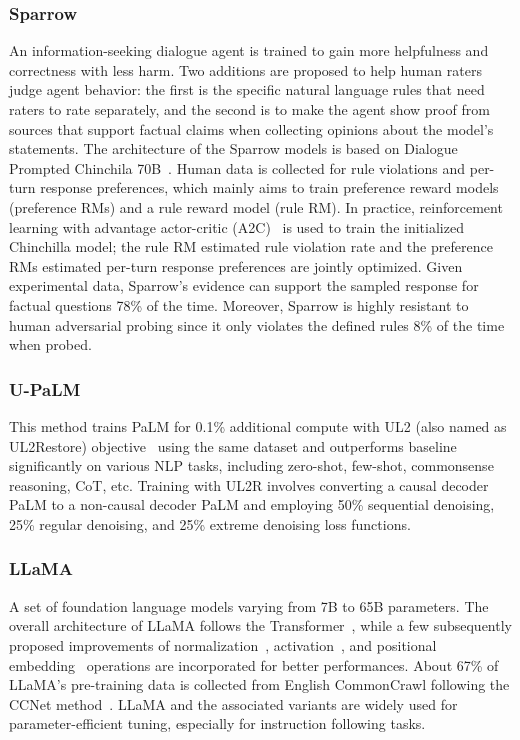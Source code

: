 \subsubsection{Sparrow~\cite{glaese2022improving}}
An information-seeking dialogue agent is trained to gain more helpfulness and correctness with less harm. Two additions are proposed to help human raters judge agent behavior: the first is the specific natural language rules that need raters to rate separately, and the second is to make the agent show proof from sources that support factual claims when collecting opinions about the model's statements. The architecture of the Sparrow models is based on Dialogue Prompted Chinchila 70B~\cite{chinchilla}. Human data is collected for rule violations and per-turn response preferences, which mainly aims to train preference reward models (preference RMs) and a rule reward model (rule RM). In practice, reinforcement learning with advantage actor-critic (A2C)~\cite{mnih2016asynchronous} is used to train the initialized Chinchilla model; the rule RM estimated rule violation rate and the preference RMs estimated per-turn response preferences are jointly optimized. Given experimental data, Sparrow's evidence can support the sampled response for factual questions 78\% of the time. Moreover, Sparrow is highly resistant to human adversarial probing since it only violates the defined rules 8\% of the time when probed.

\subsubsection{U-PaLM~\cite{U-PaLM}}
This method trains PaLM for 0.1\% additional compute with UL2 (also named as UL2Restore) objective~\cite{UL2} using the same dataset and outperforms baseline significantly on various NLP tasks, including zero-shot, few-shot, commonsense reasoning, CoT, etc. Training with UL2R involves converting a causal decoder PaLM to a non-causal decoder PaLM and employing 50\% sequential denoising, 25\% regular denoising, and 25\% extreme denoising loss functions.

\subsubsection{LLaMA~\cite{touvron2023llama}}
A set of foundation language models varying from 7B to 65B parameters. The overall architecture of LLaMA follows the Transformer~\cite{Transformers}, while a few subsequently proposed improvements of normalization~\cite{rmsnorm}, activation~\cite{shazeer2020glu}, and positional embedding~\cite{su2021roformer} operations are incorporated for better performances. About 67\% of LLaMA's pre-training data is collected from English CommonCrawl following the CCNet method~\cite{wenzek2019ccnet}. LLaMA and the associated variants are widely used for parameter-efficient tuning, especially for instruction following tasks.

